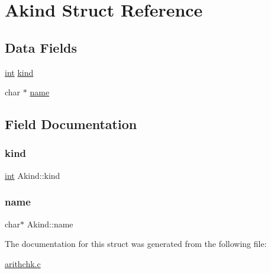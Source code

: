 \hypertarget{struct_akind}{}\section{Akind Struct Reference}
\label{struct_akind}
\subsection*{Data Fields}
\begin{DoxyCompactItemize}
\item 
\hyperlink{lp__lib_8h_adeb9ec6400320e4923ac9d836d509ddb}{int} \hyperlink{struct_akind_a07eb9af9c1fc600a16715ce8fe086097}{kind}
\item 
char $\ast$ \hyperlink{struct_akind_a4933007482399b2c5370a01d9c192f88}{name}
\end{DoxyCompactItemize}


\subsection{Field Documentation}
\mbox{\label{struct_akind_a07eb9af9c1fc600a16715ce8fe086097}} 
\subsubsection{\texorpdfstring{kind}{kind}}
{\footnotesize\ttfamily \hyperlink{lp__lib_8h_adeb9ec6400320e4923ac9d836d509ddb}{int} Akind\+::kind}

\mbox{\label{struct_akind_a4933007482399b2c5370a01d9c192f88}} 
\subsubsection{\texorpdfstring{name}{name}}
{\footnotesize\ttfamily char$\ast$ Akind\+::name}



The documentation for this struct was generated from the following file\+:\begin{DoxyCompactItemize}
\item 
\hyperlink{arithchk_8c}{arithchk.\+c}\end{DoxyCompactItemize}
